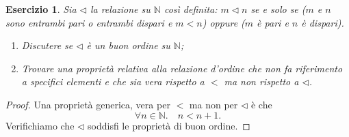 \documentclass[fontsize = 11 pt, paper=A4, oneside, index=totoc, hyperref]{article}
\theoremstyle{definition}
\theoremstyle{plain}
\newtheorem{exe}{Esercizio}[section]
\newcommand{\N}{\mathbb{N}}
\begin{document}
\begin{exe}
  \label{exe:1}
  Sia \(\lhd\) la relazione su \(\N\) così definita: \(m \lhd n\) se e solo se (\(m\) e \(n\) sono entrambi pari o entrambi dispari e \(m < n\)) oppure (\(m\) è pari e \(n\) è dispari).
  \begin{enumerate}
    \item Discutere se \(\lhd\) è un buon ordine su \(\N\);
    \item Trovare una proprietà relativa alla relazione d'ordine che non fa riferimento a specifici elementi e che sia vera rispetto a \(<\) ma non rispetto a \(\lhd\).
  \end{enumerate}
\end{exe}
\begin{proof}
  Una proprietà generica, vera per \(<\) ma non per \(\lhd\) è che
  \[
  \forall n \in \N.\quad n < n+1.
  \]
  Verifichiamo che \(\lhd\) soddisfi le proprietà di buon ordine. %
\end{proof}
\end{document}
